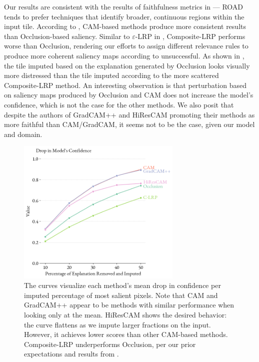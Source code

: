 Our results are consistent with the results of faithfulness metrics in \cite{gallo} --- ROAD tends to prefer techniques that identify broader, continuous regions within the input tile.
According to , CAM-based methods produce more consistent results than Occlusion-based saliency.
Similar to $\varepsilon$-LRP in \cite{gallo}, Composite-LRP performs worse than Occlusion, rendering our efforts to assign different relevance rules to produce more coherent saliency maps according to \cite{lrp, lrp-alpha-beta} unsuccessful.
As shown in , the tile imputed based on the explanation generated by Occlusion looks visually more distressed than the tile imputed according to the more scattered Composite-LRP method.
An interesting observation is that perturbation based on saliency maps produced by Occlusion and CAM does not increase the model's confidence, which is not the case for the other methods.
We also posit that despite the authors of GradCAM++ and HiResCAM promoting their methods as more faithful than CAM/GradCAM, it seems not to be the case, given our model and domain.

\begin{figure}
    \centering
      \includegraphics[width=0.7\textwidth]{img/road-curve.png}
    \caption{
    The curves visualize each method's mean drop in confidence per imputed percentage of most salient pixels.
    Note that CAM and GradCAM++ appear to be methods with similar performance when looking only at the mean.
    HiResCAM shows the desired behavior: the curve flattens as we impute larger fractions on the input.
    However, it achieves lower scores than other CAM-based methods.
    Composite-LRP underperforms Occlusion, per our prior expectations and results from \cite{gallo}.
    }
    \label{fig:road-curve}
\end{figure}


